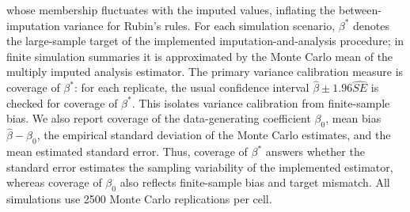 whose membership fluctuates with the imputed values, inflating the
between-imputation variance for Rubin's rules.
For each simulation scenario, \(\beta^\ast\) denotes the large-sample target
of the implemented imputation-and-analysis procedure; in finite
simulation summaries it is approximated by the Monte Carlo mean of the
multiply imputed analysis estimator.  The primary variance calibration
measure is coverage of \(\beta^\ast\): for each replicate,
the usual confidence interval \(\hat\beta\pm1.96\widehat{SE}\) is
checked for coverage of \(\beta^\ast\).  This isolates variance
calibration from finite-sample bias.  We also report coverage of the
data-generating coefficient \(\beta_0\), mean bias
\(\hat\beta-\beta_0\), the empirical standard deviation of the Monte
Carlo estimates, and the mean estimated standard error.
Thus, coverage of \(\beta^\ast\)
answers whether the standard error estimates the sampling variability of
the implemented estimator, whereas coverage of \(\beta_0\) also reflects
finite-sample bias and target mismatch.  All simulations use 2500 Monte
Carlo replications per cell.
